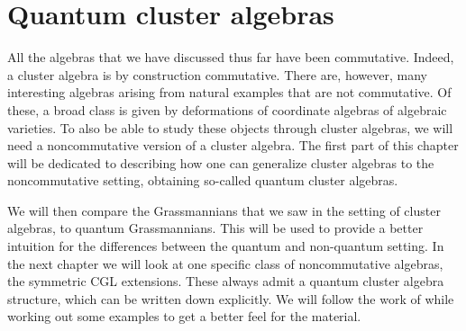 \chapter{Quantum cluster algebras}\label{sec:quantum_cluster_algebras}
\chaptertoc

\noindent
All the algebras that we have discussed thus far have been commutative. Indeed, a
cluster algebra is by construction commutative. There are, however, many interesting
algebras arising from natural examples that are not commutative. Of these, a broad
class is given by deformations of coordinate algebras of algebraic varieties. To also
be able to study these objects through cluster algebras, we will need a noncommutative
version of a cluster algebra. The first part of this chapter will be dedicated to
describing how one can generalize cluster algebras to the noncommutative setting,
obtaining so-called quantum cluster algebras.

We will then compare the Grassmannians that we saw in the setting of cluster algebras,
to quantum Grassmannians. This will be used to provide a better intuition for the
differences between the quantum and non-quantum setting. In the next chapter we will
look at one specific class of noncommutative algebras, the symmetric CGL extensions.
These always admit a quantum cluster algebra structure, which can be written down
explicitly. We will follow the work of \cite{GoodearlYakimov2017QCA} while working out
some examples to get a better feel for the material.

